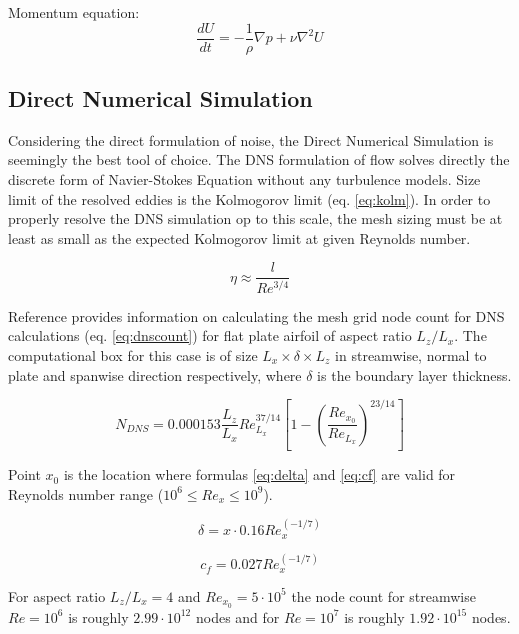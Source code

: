 Momentum equation:
\begin{equation} \label{eq:momentum}
\frac{dU}{dt} = - \frac{1}{\rho} \nabla p + \nu \nabla^{2} U
\end{equation}

\subsection{Direct Numerical Simulation} \label{DNS}
Considering the direct formulation of noise, the Direct Numerical Simulation is seemingly the best tool of choice. The DNS formulation of flow solves directly the discrete form of Navier-Stokes Equation without any turbulence models. Size limit of the resolved eddies is the Kolmogorov limit (eq. \ref{eq:kolm}). In order to properly resolve the DNS simulation op to this scale, the mesh sizing must be at least as small as the expected Kolmogorov limit at given Reynolds number.

\begin{equation} \label{eq:kolm}
\eta \approx \frac{l}{Re^{3/4}}
\end{equation}

Reference \citep{LES_size} provides information on calculating the mesh grid node count for DNS calculations (eq. \ref{eq:dnscount}) for flat plate airfoil of aspect ratio $L_z / L_x$. The computational box for this case is of size $L_x \times \delta \times L_z$ in streamwise, normal to plate and spanwise direction respectively, where $\delta$ is the boundary layer thickness.

\begin{equation} \label{eq:dnscount}
N_{DNS} = 0.000153 \frac{L_z}{L_x} Re_{L_x}^{37/14} \left[ 1 - \left( \frac{Re_{x_0}}{Re_{L_x}} \right)^{23/14} \right]
\end{equation}

Point $x_0$ is the location where formulas \ref{eq:delta} and \ref{eq:cf} are valid for Reynolds number range ($10^6 \leq Re_x \leq 10^9$).

\begin{equation} \label{eq:delta}
\delta = x \cdot  0.16 Re_x^{(-1/7)}
\end{equation}

\begin{equation} \label{eq:cf}
c_f = 0.027 Re_x^{(-1/7)}
\end{equation}

For aspect ratio $L_z / L_x = 4$ and $Re_{x_0} = 5 \cdot 10^5$ the node count for streamwise $Re = 10^6$ is roughly $2.99 \cdot 10^{12}$ nodes and for $Re = 10^7$ is roughly $1.92 \cdot 10^{15}$ nodes.

